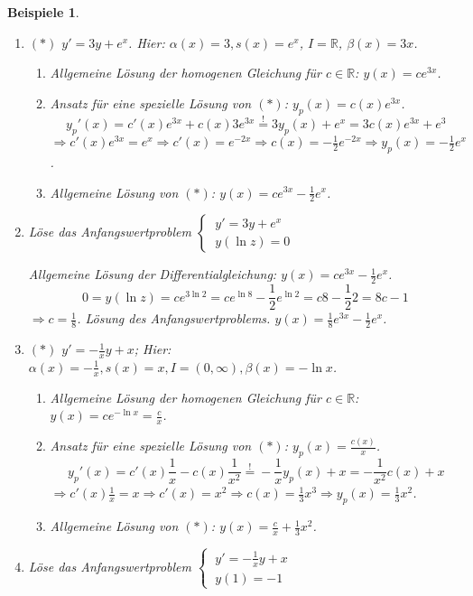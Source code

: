 \documentclass[12pt]{extreport} %
\newcommand{\R}{\mathbb{R}}
\theoremstyle{named}
\theoremstyle{nnamed}
\theoremstyle{itshape}
\theoremstyle{normal}
\newtheorem*{beispiele}{Beispiele}
\begin{document}
\begin{beispiele}
\begin{enumerate}
			\bigskip
		
			Allgemeine Lösung der Differentialgleichung: $y(x) = c e^{x^{2}} - \frac{1}{2}$.
			$$ 0 = y(1) = c e - \frac{1}{2} \Rightarrow c = \frac{1}{2} e^{-1} \Rightarrow y(x) = \frac{1}{2} e^{x^{2} - 1} - \frac{1}{2} $$
		\item $(*)$ $y' = 3y + e^{x}$. Hier: $\alpha(x) = 3, s(x) = e^{x}$, $I = \R$, $\beta(x) = 3x$.
			\begin{enumerate}[label=\arabic*.]
				\item Allgemeine Lösung der homogenen Gleichung für $c \in \R$: $y(x) = c e^{3x}$.
				\item Ansatz für eine spezielle Lösung von $(*)$: $y_{p}(x) = c(x) e^{3x}$.
					$$ y_{p}'(x) = c'(x) e^{3x} + c(x) 3 e^{3x} \overset{!}{=} 3y_{p}(x) + e^{x} = 3 c(x) e^{3x} + e^{3} $$
					$\Rightarrow c'(x) e^{3x} = e^{x} \Rightarrow c'(x) = e^{-2x} \Rightarrow c(x) = -\frac{1}{2} e^{-2x} \Rightarrow y_{p}(x) =-\frac{1}{2} e^{x}$.
				\item Allgemeine Lösung von $(*)$: $y(x) = c e^{3x} - \frac{1}{2} e^{x}$.
			\end{enumerate}
		\item Löse das Anfangswertproblem $\begin{cases} ~y' = 3y + e^{x} \\ ~y(\ln z) = 0 \end{cases}$ 
		
			\bigskip
			
			Allgemeine Lösung der Differentialgleichung: $y(x) = c e^{3x} - \frac{1}{2} e^{x}$.
			$$ 0 = y(\ln z) = c e^{3 \ln 2} = c e^{\ln 8} - \frac{1}{2} e^{\ln 2} = c 8 - \frac{1}{2} 2 = 8c - 1 $$
			$\Rightarrow c = \frac{1}{8}$. Lösung des Anfangswertproblems. $y(x) = \frac{1}{8} e^{3x} - \frac{1}{2} e^{x}$.
		\item $(*)$ $y' = - \frac{1}{x} y + x$; Hier: $\alpha(x) = - \frac{1}{x}, s(x) = x, I = (0, \infty), \beta(x) = -\ln x$.
			\begin{enumerate}[label=\arabic*.]
				\item Allgemeine Lösung der homogenen Gleichung für $c \in \R$: $y(x) = c e^{-\ln x} = \frac{c}{x}$.
				\item Ansatz für eine spezielle Lösung von $(*)$: $y_{p}(x) = \frac{c(x)}{x}$.
					$$ y_{p}'(x) = c'(x) \frac{1}{x} - c(x) \frac{1}{x^{2}} \overset{!}{=} - \frac{1}{x} y_{p}(x) + x = - \frac{1}{x^{2}} c(x) + x $$
					$\Rightarrow c'(x) \frac{1}{x} = x \Rightarrow c'(x) = x^{2} \Rightarrow c(x) = \frac{1}{3} x^{3} \Rightarrow y_{p}(x) = \frac{1}{3} x^{2}$.
				\item Allgemeine Lösung von $(*)$: $y(x) = \frac{c}{x} + \frac{1}{3} x^{2}$.
			\end{enumerate}
		\item Löse das Anfangswertproblem $\begin{cases} ~y' = - \frac{1}{x} y + x \\ ~y(1) = - 1 \end{cases}$ 


\end{enumerate}
\end{beispiele}
\end{document}
